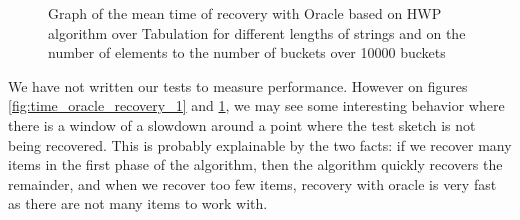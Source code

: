 \begin{figure}
    \centering
{}
     \hfill
        \caption{Graph of the mean time of recovery with Oracle based on HWP algorithm over Tabulation for different lengths of strings   and on the number of elements to the number of buckets over 10000 buckets }
        \label{fig:time_oracle_recovery_2}
\end{figure}




We have not written our tests to measure performance. However on figures \ref{fig:time_oracle_recovery_1} and \ref{fig:time_oracle_recovery_2}, we may see some interesting behavior where there is a window of a slowdown around a point where the test sketch is not being recovered. This is probably explainable by the two facts: if we recover many items in the first phase of the algorithm, then the algorithm quickly recovers the remainder, and when we recover too few items, recovery with oracle is very fast as there are not many items to work with.

